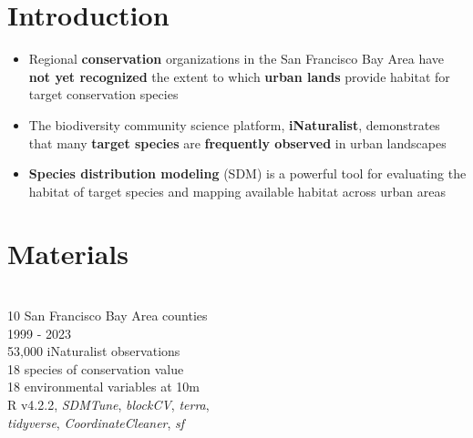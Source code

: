 \documentclass[a0paper,fleqn]{betterposter}
\begin{document}
{


\section{Introduction}

\vspace{-2cm}
\begin{itemize}
\item Regional \textbf{conservation} organizations in the San Francisco Bay Area have \textbf{not yet recognized} the extent to which \textbf{urban lands} provide habitat for target conservation species
\item The biodiversity community science platform, \textbf{iNaturalist}, demonstrates that many \textbf{target species} are \textbf{frequently observed} in urban landscapes
\item \textbf{Species distribution modeling} (SDM) is a powerful tool for evaluating the habitat of target species and mapping available habitat across urban areas
\end{itemize}

\section{Materials}
\def\iconspace{2mm}
\vspace{-15mm}
\\\faMapO   \hspace{1cm} 10 San Francisco Bay Area counties
\vspace{\iconspace}
\\\faClockO \hspace{1cm} 1999 - 2023
\vspace{\iconspace}
\\\faMapMarker \hspace{1.3cm} 53,000 iNaturalist observations
\vspace{\iconspace}
\\\faLeaf \hspace{1cm} 18 species of conservation value
\vspace{\iconspace}
\\\faSunO \hspace{.9cm} 18 environmental variables at 10m
\vspace{\iconspace}
\\\faCode \hspace{1cm} R v4.2.2, \textit{SDMTune}, \textit{blockCV}, \textit{terra}, 
\\ \hspace*{2.1cm} \textit{tidyverse}, \textit{CoordinateCleaner}, \textit{sf}


}
\end{document}
